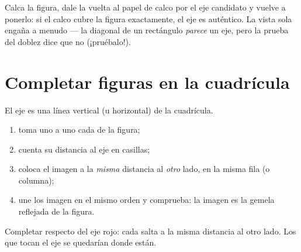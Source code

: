 \begin{example}\label{ex:g4:symmetry:trace}
Calca la figura, dale la vuelta al papel de calco por el eje
candidato y vuelve a ponerlo: si el calco cubre la figura exactamente, el
eje es auténtico. La vista sola engaña a menudo --- la diagonal de un rectángulo
\emph{parece} un eje, pero la prueba del doblez dice que no (¡pruébalo!).
\end{example}

\section{Completar figuras en la cuadrícula}

\begin{method}\label{met:g4:symmetry:grid}
El eje es una línea vertical (u horizontal) de la cuadrícula.
\begin{enumerate}
  \item toma uno a uno cada  de la figura;
  \item cuenta su distancia al eje en casillas;
  \item coloca el  imagen a la \emph{misma} distancia al
        \emph{otro} lado, en la misma fila (o columna);
  \item une los  imagen en el mismo orden y comprueba: la
        imagen es la gemela reflejada de la figura.
\end{enumerate}
\end{method}

\begin{omfigure}

{\small Completar respecto del eje rojo: cada  salta a la misma
distancia al otro lado. Los  que tocan el eje se quedarían
donde están.}
\end{omfigure}

